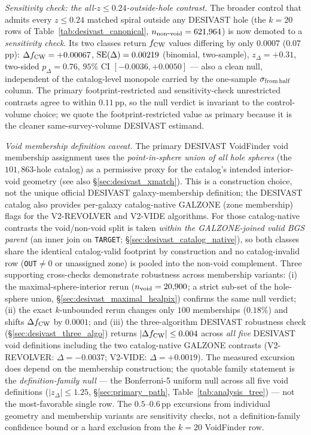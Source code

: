 \documentclass[aps,prd,twocolumn,superscriptaddress,showpacs,preprintnumbers,nofootinbib,longbibliography,floatfix]{revtex4-2}
\begin{document}
\emph{Sensitivity check: the all-$z\le0.24$-outside-hole contrast.}
The broader control that admits every $z \le 0.24$ matched spiral
outside any DESIVAST hole (the $k=20$ rows of
Table~\ref{tab:desivast_canonical}, $n_{\rm non\mbox{-}void} =
621{,}964$) is now demoted to a \emph{sensitivity check}. Its two
classes return $f_{\rm CW}$ values differing by only $0.0007$
($0.07$\,pp): $\Delta f_{\rm CW} = +0.00067$, ${\rm SE}(\Delta) =
0.00219$ (binomial, two-sample), $z_\Delta = +0.31$, two-sided
$p_\Delta = 0.76$, $95\%$ CI $[-0.0036, +0.0050]$ --- also a clean null,
independent of the catalog-level monopole carried by the one-sample
$\sigma_{\rm from\,half}$ column. The primary footprint-restricted and
sensitivity-check unrestricted contrasts agree to within $0.11$\,pp,
so the null verdict is invariant to the control-volume choice; we quote
the footprint-restricted value as primary because it is the cleaner
same-survey-volume DESIVAST estimand.

\emph{Void membership definition caveat.}
The primary DESIVAST VoidFinder void membership assignment uses the
\emph{point-in-sphere union of all hole spheres} (the $101{,}863$-hole
catalog) as a permissive proxy for the catalog's intended interior-void
geometry (see also \S\ref{sec:desivast_xmatch}). This is a construction
choice, not the unique official DESIVAST galaxy-membership definition;
the DESIVAST catalog also provides per-galaxy catalog-native GALZONE
(zone membership) flags for the V2-REVOLVER and V2-VIDE algorithms.
For those catalog-native contrasts the void/non-void split is taken
\emph{within the GALZONE-joined valid BGS parent} (an inner join on
\texttt{TARGET}; \S\ref{sec:desivast_catalog_native}), so both classes
share the identical catalog-valid footprint by construction and no
catalog-invalid row (\texttt{OUT}$\neq0$ or unassigned zone) is pooled
into the non-void complement.
Three supporting cross-checks demonstrate robustness across membership
variants: (i) the maximal-sphere-interior rerun ($n_{\rm void} = 20{,}900$;
a strict sub-set of the hole-sphere union, \S\ref{sec:desivast_maximal_healpix})
confirms the same null verdict; (ii) the exact $k$-unbounded rerun
changes only $100$ memberships ($0.18\%$) and shifts $\Delta f_{\rm CW}$
by $0.0001$; and (iii) the three-algorithm DESIVAST robustness check
(\S\ref{sec:desivast_three_algo}) returns $|\Delta f_{\rm CW}| \le 0.004$
across \emph{all five} DESIVAST void definitions including the two
catalog-native GALZONE contrasts (V2-REVOLVER: $\Delta = -0.0037$;
V2-VIDE: $\Delta = +0.0019$). The measured excursion does depend on the
membership construction; the quotable family statement is the
\emph{definition-family null} --- the Bonferroni-5 uniform null across
all five void definitions ($|z_\Delta| \le 1.25$,
\S\ref{sec:primary_path}, Table~\ref{tab:analysis_tree}) --- not the
most-favorable single row. The $0.5$--$0.6$\,pp excursions from individual
geometry and membership variants are sensitivity checks, not a
definition-family confidence bound or a hard exclusion from the $k=20$
VoidFinder row.
\end{document}
